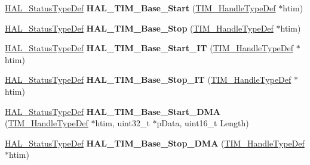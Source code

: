 \begin{DoxyCompactItemize}
\mbox{\label{group___t_i_m___exported___functions___group1_gaf7e5ee80207a338050413e14f7bd24f9}} 
\hyperlink{stm32f4xx__hal__def_8h_a63c0679d1cb8b8c684fbb0632743478f}{H\+A\+L\+\_\+\+Status\+Type\+Def} {\bfseries H\+A\+L\+\_\+\+T\+I\+M\+\_\+\+Base\+\_\+\+Start} (\hyperlink{struct_t_i_m___handle_type_def}{T\+I\+M\+\_\+\+Handle\+Type\+Def} $\ast$htim)
\item 
\mbox{\label{group___t_i_m___exported___functions___group1_ga78697261126cd2facc463b81e8c4b238}} 
\hyperlink{stm32f4xx__hal__def_8h_a63c0679d1cb8b8c684fbb0632743478f}{H\+A\+L\+\_\+\+Status\+Type\+Def} {\bfseries H\+A\+L\+\_\+\+T\+I\+M\+\_\+\+Base\+\_\+\+Stop} (\hyperlink{struct_t_i_m___handle_type_def}{T\+I\+M\+\_\+\+Handle\+Type\+Def} $\ast$htim)
\item 
\mbox{\label{group___t_i_m___exported___functions___group1_gae517d80e2ac713069767df8e8915971e}} 
\hyperlink{stm32f4xx__hal__def_8h_a63c0679d1cb8b8c684fbb0632743478f}{H\+A\+L\+\_\+\+Status\+Type\+Def} {\bfseries H\+A\+L\+\_\+\+T\+I\+M\+\_\+\+Base\+\_\+\+Start\+\_\+\+IT} (\hyperlink{struct_t_i_m___handle_type_def}{T\+I\+M\+\_\+\+Handle\+Type\+Def} $\ast$htim)
\item 
\mbox{\label{group___t_i_m___exported___functions___group1_ga19443605c97f15b5ede7d8337534ece4}} 
\hyperlink{stm32f4xx__hal__def_8h_a63c0679d1cb8b8c684fbb0632743478f}{H\+A\+L\+\_\+\+Status\+Type\+Def} {\bfseries H\+A\+L\+\_\+\+T\+I\+M\+\_\+\+Base\+\_\+\+Stop\+\_\+\+IT} (\hyperlink{struct_t_i_m___handle_type_def}{T\+I\+M\+\_\+\+Handle\+Type\+Def} $\ast$htim)
\item 
\mbox{\label{group___t_i_m___exported___functions___group1_ga8246aece4afe559642a6da298f7b157a}} 
\hyperlink{stm32f4xx__hal__def_8h_a63c0679d1cb8b8c684fbb0632743478f}{H\+A\+L\+\_\+\+Status\+Type\+Def} {\bfseries H\+A\+L\+\_\+\+T\+I\+M\+\_\+\+Base\+\_\+\+Start\+\_\+\+D\+MA} (\hyperlink{struct_t_i_m___handle_type_def}{T\+I\+M\+\_\+\+Handle\+Type\+Def} $\ast$htim, uint32\+\_\+t $\ast$p\+Data, uint16\+\_\+t Length)
\item 
\mbox{\label{group___t_i_m___exported___functions___group1_ga7673776de6e35f5cbe887e62e13e87b5}} 
\hyperlink{stm32f4xx__hal__def_8h_a63c0679d1cb8b8c684fbb0632743478f}{H\+A\+L\+\_\+\+Status\+Type\+Def} {\bfseries H\+A\+L\+\_\+\+T\+I\+M\+\_\+\+Base\+\_\+\+Stop\+\_\+\+D\+MA} (\hyperlink{struct_t_i_m___handle_type_def}{T\+I\+M\+\_\+\+Handle\+Type\+Def} $\ast$htim)
\end{DoxyCompactItemize}


